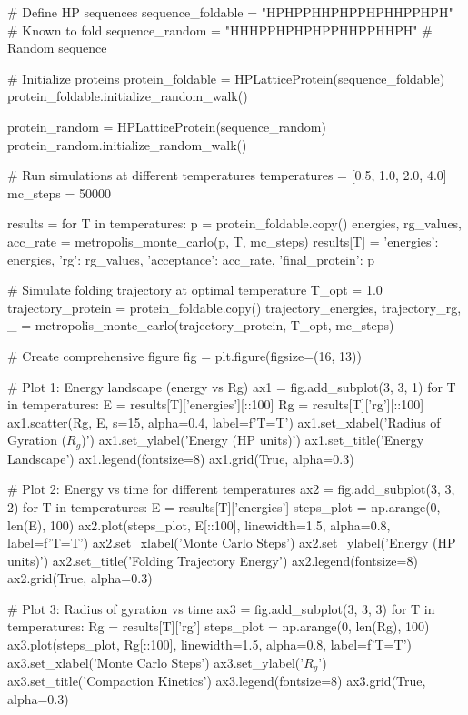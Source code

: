 \documentclass[a4paper, 11pt]{article}
\begin{document}
\begin{pycode}
# Define HP sequences
sequence_foldable = "HPHPPHHPHPPHPHHPPHPH"  # Known to fold
sequence_random = "HHHPPHPHPHPPHHPPHHPH"    # Random sequence

# Initialize proteins
protein_foldable = HPLatticeProtein(sequence_foldable)
protein_foldable.initialize_random_walk()

protein_random = HPLatticeProtein(sequence_random)
protein_random.initialize_random_walk()

# Run simulations at different temperatures
temperatures = [0.5, 1.0, 2.0, 4.0]
mc_steps = 50000

results = {}
for T in temperatures:
    p = protein_foldable.copy()
    energies, rg_values, acc_rate = metropolis_monte_carlo(p, T, mc_steps)
    results[T] = {
        'energies': energies,
        'rg': rg_values,
        'acceptance': acc_rate,
        'final_protein': p
    }

# Simulate folding trajectory at optimal temperature
T_opt = 1.0
trajectory_protein = protein_foldable.copy()
trajectory_energies, trajectory_rg, _ = metropolis_monte_carlo(trajectory_protein, T_opt, mc_steps)

# Create comprehensive figure
fig = plt.figure(figsize=(16, 13))

# Plot 1: Energy landscape (energy vs Rg)
ax1 = fig.add_subplot(3, 3, 1)
for T in temperatures:
    E = results[T]['energies'][::100]
    Rg = results[T]['rg'][::100]
    ax1.scatter(Rg, E, s=15, alpha=0.4, label=f'T={T}')
ax1.set_xlabel('Radius of Gyration ($R_g$)')
ax1.set_ylabel('Energy (HP units)')
ax1.set_title('Energy Landscape')
ax1.legend(fontsize=8)
ax1.grid(True, alpha=0.3)

# Plot 2: Energy vs time for different temperatures
ax2 = fig.add_subplot(3, 3, 2)
for T in temperatures:
    E = results[T]['energies']
    steps_plot = np.arange(0, len(E), 100)
    ax2.plot(steps_plot, E[::100], linewidth=1.5, alpha=0.8, label=f'T={T}')
ax2.set_xlabel('Monte Carlo Steps')
ax2.set_ylabel('Energy (HP units)')
ax2.set_title('Folding Trajectory Energy')
ax2.legend(fontsize=8)
ax2.grid(True, alpha=0.3)

# Plot 3: Radius of gyration vs time
ax3 = fig.add_subplot(3, 3, 3)
for T in temperatures:
    Rg = results[T]['rg']
    steps_plot = np.arange(0, len(Rg), 100)
    ax3.plot(steps_plot, Rg[::100], linewidth=1.5, alpha=0.8, label=f'T={T}')
ax3.set_xlabel('Monte Carlo Steps')
ax3.set_ylabel('$R_g$')
ax3.set_title('Compaction Kinetics')
ax3.legend(fontsize=8)
ax3.grid(True, alpha=0.3)


\end{pycode}
\end{document}
